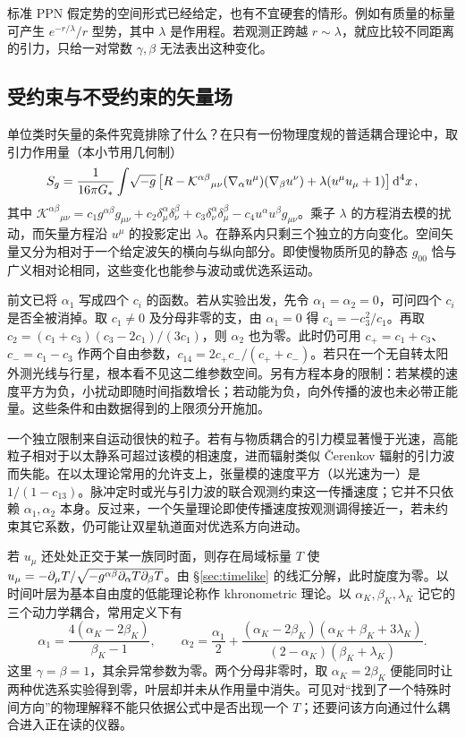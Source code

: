 标准 PPN 假定势的空间形式已经给定，也有不宜硬套的情形。例如有质量的标量可产生 $e^{-r/\lambda}/r$ 型势，其中 $\lambda$ 是作用程。若观测正跨越 $r\sim\lambda$，就应比较不同距离的引力，只给一对常数 $\gamma,\beta$ 无法表出这种变化。

\subsection{受约束与不受约束的矢量场}

单位类时矢量的条件究竟排除了什么？在只有一份物理度规的普适耦合理论中，取引力作用量（本小节用几何制）
\[
 S_g=\frac{1}{16\pi G_*}\int\!\sqrt{-g}\left[
 R-\mathcal K^{\alpha\beta}{}_{\mu\nu}
       (\nabla_\alpha u^\mu)(\nabla_\beta u^\nu)
       +\lambda(u^\mu u_\mu+1)\right]\dd[4]{x},
\]
其中 $\mathcal K^{\alpha\beta}{}_{\mu\nu}=c_1g^{\alpha\beta}g_{\mu\nu}
+c_2\delta^\alpha_\mu\delta^\beta_\nu+c_3\delta^\alpha_\nu\delta^\beta_\mu
-c_4u^\alpha u^\beta g_{\mu\nu}$。乘子 $\lambda$ 的方程消去模的扰动，而矢量方程沿 $u^\mu$ 的投影定出 $\lambda$。在静系内只剩三个独立的方向变化。空间矢量又分为相对于一个给定波矢的横向与纵向部分。即使慢物质所见的静态 $g_{00}$ 恰与广义相对论相同，这些变化也能参与波动或优选系运动。

前文已将 $\alpha_1$ 写成四个 $c_i$ 的函数。若从实验出发，先令 $\alpha_1=\alpha_2=0$，可问四个 $c_i$ 是否全被消掉。取 $c_1\ne0$ 及分母非零的支，由 $\alpha_1=0$ 得 $c_4=-c_3^2/c_1$。再取 $c_2=(c_1+c_3)(c_3-2c_1)/(3c_1)$，则 $\alpha_2$ 也为零。此时仍可用 $c_+=c_1+c_3$、$c_-=c_1-c_3$ 作两个自由参数，$c_{14}=2c_+c_-/(c_++c_-)$。若只在一个无自转太阳外测光线与行星，根本看不见这二维参数空间。另有方程本身的限制：若某模的速度平方为负，小扰动即随时间指数增长；若动能为负，向外传播的波也未必带正能量。这些条件和由数据得到的上限须分开施加。

一个独立限制来自运动很快的粒子。若有与物质耦合的引力模显著慢于光速，高能粒子相对于以太静系可超过该模的相速度，进而辐射类似 Čerenkov 辐射的引力波而失能。在以太理论常用的允许支上，张量模的速度平方（以光速为一）是 $1/(1-c_{13})$。脉冲定时或光与引力波的联合观测约束这一传播速度；它并不只依赖 $\alpha_1,\alpha_2$ 本身。反过来，一个矢量理论即使传播速度按观测调得接近一，若未约束其它系数，仍可能让双星轨道面对优选系方向进动。

若 $u_\mu$ 还处处正交于某一族同时面，则存在局域标量 $T$ 使 $u_\mu=-\partial_\mu T/\sqrt{-g^{\alpha\beta}\partial_\alpha T\partial_\beta T}$。由 \S\ref{sec:timelike} 的线汇分解，此时旋度为零。以时间叶层为基本自由度的低能理论称作 khronometric 理论。以 $\alpha_K,\beta_K,\lambda_K$ 记它的三个动力学耦合，常用定义下有
\[
 \alpha_1=\frac{4(\alpha_K-2\beta_K)}{\beta_K-1},\qquad
 \alpha_2=\frac{\alpha_1}{2}+
 \frac{(\alpha_K-2\beta_K)(\alpha_K+\beta_K+3\lambda_K)}
 {(2-\alpha_K)(\beta_K+\lambda_K)} .
\]
这里 $\gamma=\beta=1$，其余异常参数为零。两个分母非零时，取 $\alpha_K=2\beta_K$ 便能同时让两种优选系实验得到零，叶层却并未从作用量中消失。可见对“找到了一个特殊时间方向”的物理解释不能只依据公式中是否出现一个 $T$；还要问该方向通过什么耦合进入正在读的仪器。

